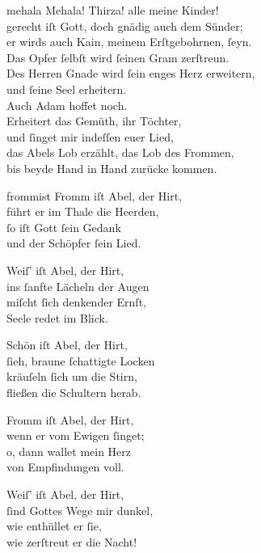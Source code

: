 \documentclass[tocstyle=ref-genre]{ees}
\begin{document}
{\begin{movement}{mehala}
  \voice[Eva]
  Mehala! Thirza! alle meine Kinder!\\
  gerecht iſt Gott, doch gnädig auch dem Sünder;\\
  er wirds auch Kain, meinem Erſtgebohrnen, ſeyn.\\
  Das Opfer ſelbſt wird ſeinen Gram zerſtreun.\\
  Des Herren Gnade wird ſein enges Herz erweitern,\\
  und ſeine Seel erheitern.\\
  Auch Adam hoffet noch.\\
  Erheitert das Gemüth, ihr Töchter,\\
  und ſinget mir indeſſen euer Lied,\\
  das Abels Lob erzählt, das Lob des Frommen,\\
  bis beyde Hand in Hand zurücke kommen.
\end{movement}

\begin{movement}{frommist}
  \voice[Mehala]
  Fromm iſt Abel, der Hirt,\\
  führt er im Thale die Heerden,\\
  ſo iſt Gott ſein Gedank\\
  und der Schöpfer ſein Lied.

  \voice[Thirza]
  Weiſ’ iſt Abel, der Hirt,\\
  ins ſanfte Lächeln der Augen\\
  miſcht ſich denkender Ernſt,\\
  Seele redet im Blick.

  \voice[Mehala]
  Schön iſt Abel, der Hirt,\\
  ſieh, braune ſchattigte Locken\\
  kräuſeln ſich um die Stirn,\\
  fließen die Schultern herab.

  \voice[Thirza]
  Fromm iſt Abel, der Hirt,\\
  wenn er vom Ewigen ſinget;\\
  o, dann wallet mein Herz\\
  von Empfindungen voll.

  \voice[Mehala]
  Weiſ’ iſt Abel, der Hirt,\\
  ſind Gottes Wege mir dunkel,\\
  wie enthüllet er ſie,\\
  wie zerſtreut er die Nacht!


\end{movement}}
\end{document}
